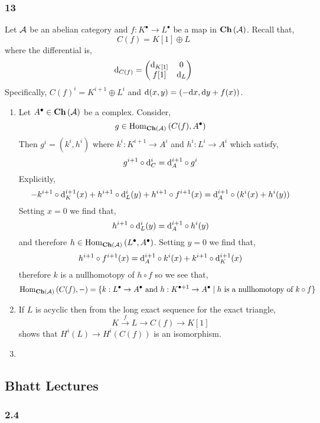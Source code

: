 \documentclass[12pt]{article}
\begin{document}
\subsubsection*{13}


Let $\mathcal{A}$ be an abelian category and $f : K^\bullet \to L^\bullet$ be a map in $\mathbf{Ch}\left( \mathcal{A} \right)$. Recall that,
\[ C(f) = K[1] \oplus L \]
where the differential is,
\[ \mathrm{d}_{C(f)} = \begin{pmatrix}
\mathrm{d}_{K[1]} & 0
\\
f[1] & \mathrm{d}_L
\end{pmatrix} \]
Specifically, $C(f)^i = K^{i+1} \oplus L^i$ and $\mathrm{d}(x,y) = (-\mathrm{d}{x}, \mathrm{d}{y} + f(x))$.

\begin{enumerate}
\item Let $A^\bullet \in \mathbf{Ch}\left( \mathcal{A} \right)$ be a complex. Consider,
\[ g \in \mathrm{Hom}_{\mathbf{Ch}\left( \mathcal{A} \right)} \left( C(f), A^\bullet \right) \]
Then $g^i = (k^{i}, h^i)$ where $k^i : K^{i+1} \to A^i$ and $h^i : L^i \to A^i$ which satisfy,
\[ g^{i+1} \circ \mathrm{d}_C^i = \mathrm{d}_A^{i+1} \circ g^i \]
Explicitly,
\[ -k^{i+1} \circ \mathrm{d}_K^{i+1}(x) +  h^{i+1} \circ \mathrm{d}_L^i(y) + h^{i+1} \circ f^{i+1}(x) = \mathrm{d}_A^{i+1} \circ (k^i(x) + h^i(y)) \]
Setting $x = 0$ we find that,
\[ h^{i+1} \circ \mathrm{d}_L^i(y) = \mathrm{d}_A^{i+1} \circ h^i(y) \]
and therefore $h \in \mathrm{Hom}_{\mathbf{Ch}\left( \mathcal{A} \right)} \left( L^\bullet, A^\bullet \right)$. 
Setting $y = 0$ we find that,
\[  h^{i+1} \circ f^{i+1}(x) = \mathrm{d}_A^{i+1} \circ k^i(x) + k^{i+1} \circ \mathrm{d}_K^{i+1}(x) \]
therefore $k$ is a nullhomotopy of $h \circ f$ so we see that,
\[ \mathrm{Hom}_{\mathbf{Ch}\left( \mathcal{A} \right)} \left( C(f), - \right) = \{ k : L^\bullet \to A^\bullet \text{ and } h : K^{\bullet + 1} \to A^\bullet \mid h \text{ is a nullhomotopy of } k \circ f \} \]

\item If $L$ is acyclic then from the long exact sequence for the exact triangle,
\[ K \xrightarrow{f} L \to C(f) \to K[1] \]
shows that $H^i(L) \to H^i(C(f))$ is an isomorphism.

\item 
\end{enumerate}

\subsection{Bhatt Lectures}

\subsubsection*{2.4}
\end{document}
